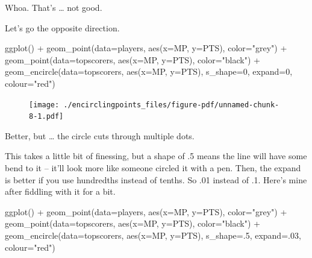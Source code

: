 \documentclass[
  letterpaper,
  DIV=11,
  numbers=noendperiod]{scrreprt}
\newenvironment{Shaded}{\begin{snugshade}}{\end{snugshade}}
\newcommand{\AttributeTok}[1]{\textcolor[rgb]{0.40,0.45,0.13}{#1}}
\newcommand{\DecValTok}[1]{\textcolor[rgb]{0.68,0.00,0.00}{#1}}
\newcommand{\FunctionTok}[1]{\textcolor[rgb]{0.28,0.35,0.67}{#1}}
\newcommand{\NormalTok}[1]{\textcolor[rgb]{0.00,0.23,0.31}{#1}}
\newcommand{\SpecialCharTok}[1]{\textcolor[rgb]{0.37,0.37,0.37}{#1}}
\newcommand{\StringTok}[1]{\textcolor[rgb]{0.13,0.47,0.30}{#1}}
\begin{document}
Whoa. That's \ldots{} not good.

Let's go the opposite direction.

\begin{Shaded}
\begin{Highlighting}[]
\FunctionTok{ggplot}\NormalTok{() }\SpecialCharTok{+} 
  \FunctionTok{geom\_point}\NormalTok{(}\AttributeTok{data=}\NormalTok{players, }\FunctionTok{aes}\NormalTok{(}\AttributeTok{x=}\NormalTok{MP, }\AttributeTok{y=}\NormalTok{PTS), }\AttributeTok{color=}\StringTok{"grey"}\NormalTok{) }\SpecialCharTok{+} 
  \FunctionTok{geom\_point}\NormalTok{(}\AttributeTok{data=}\NormalTok{topscorers, }\FunctionTok{aes}\NormalTok{(}\AttributeTok{x=}\NormalTok{MP, }\AttributeTok{y=}\NormalTok{PTS), }\AttributeTok{color=}\StringTok{"black"}\NormalTok{) }\SpecialCharTok{+} 
  \FunctionTok{geom\_encircle}\NormalTok{(}\AttributeTok{data=}\NormalTok{topscorers, }\FunctionTok{aes}\NormalTok{(}\AttributeTok{x=}\NormalTok{MP, }\AttributeTok{y=}\NormalTok{PTS), }\AttributeTok{s\_shape=}\DecValTok{0}\NormalTok{, }\AttributeTok{expand=}\DecValTok{0}\NormalTok{, }\AttributeTok{colour=}\StringTok{"red"}\NormalTok{)}
\end{Highlighting}
\end{Shaded}

\begin{figure}[H]

{\centering \texttt{[image: ./encirclingpoints\_files/figure-pdf/unnamed-chunk-8-1.pdf]}

}

\end{figure}

Better, but \ldots{} the circle cuts through multiple dots.

This takes a little bit of finessing, but a shape of .5 means the line
will have some bend to it -- it'll look more like someone circled it
with a pen. Then, the expand is better if you use hundredths instead of
tenths. So .01 instead of .1. Here's mine after fiddling with it for a
bit.

\begin{Shaded}
\begin{Highlighting}[]
\FunctionTok{ggplot}\NormalTok{() }\SpecialCharTok{+} 
  \FunctionTok{geom\_point}\NormalTok{(}\AttributeTok{data=}\NormalTok{players, }\FunctionTok{aes}\NormalTok{(}\AttributeTok{x=}\NormalTok{MP, }\AttributeTok{y=}\NormalTok{PTS), }\AttributeTok{color=}\StringTok{"grey"}\NormalTok{) }\SpecialCharTok{+} 
  \FunctionTok{geom\_point}\NormalTok{(}\AttributeTok{data=}\NormalTok{topscorers, }\FunctionTok{aes}\NormalTok{(}\AttributeTok{x=}\NormalTok{MP, }\AttributeTok{y=}\NormalTok{PTS), }\AttributeTok{color=}\StringTok{"black"}\NormalTok{) }\SpecialCharTok{+} 
  \FunctionTok{geom\_encircle}\NormalTok{(}\AttributeTok{data=}\NormalTok{topscorers, }\FunctionTok{aes}\NormalTok{(}\AttributeTok{x=}\NormalTok{MP, }\AttributeTok{y=}\NormalTok{PTS), }\AttributeTok{s\_shape=}\NormalTok{.}\DecValTok{5}\NormalTok{, }\AttributeTok{expand=}\NormalTok{.}\DecValTok{03}\NormalTok{, }\AttributeTok{colour=}\StringTok{"red"}\NormalTok{)}
\end{Highlighting}
\end{Shaded}
\end{document}
